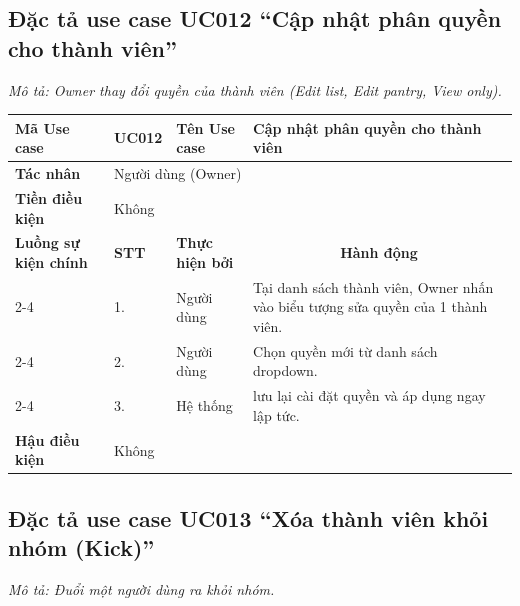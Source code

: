 \documentclass[../main.tex]{subfiles}
\begin{document}
\subsection{Đặc tả use case UC012 ``Cập nhật phân quyền cho thành viên''}
\textit{Mô tả: Owner thay đổi quyền của thành viên (Edit list, Edit pantry, View only).}
\vspace{0.5cm}

\begingroup
\renewcommand{\arraystretch}{1.5}

\begin{longtable}{|p{2.7cm}|p{0.8cm}|p{2.6cm}|p{7.3cm}|}
\hline
\cellcolor[HTML]{D5F5E3}\textbf{Mã Use case} & \multicolumn{1}{l|}{UC012} & \cellcolor[HTML]{D5F5E3}\textbf{Tên Use case} & Cập nhật phân quyền cho thành viên \\ \hline
\cellcolor[HTML]{D5F5E3}\textbf{Tác nhân} & \multicolumn{3}{p{10.7cm}|}{Người dùng (Owner)} \\ \hline
\cellcolor[HTML]{D5F5E3}\textbf{Tiền điều kiện} & \multicolumn{3}{p{10.7cm}|}{Không} \\ \hline

\cellcolor[HTML]{D5F5E3}\textbf{Luồng sự kiện chính} & \cellcolor[HTML]{FDEBD0}\textbf{STT} & \cellcolor[HTML]{FDEBD0}\textbf{Thực hiện bởi} & \multicolumn{1}{c|}{\cellcolor[HTML]{FDEBD0}\textbf{Hành động}} \\ \cline{2-4} 
\cellcolor[HTML]{D5F5E3} & 1. & Người dùng & Tại danh sách thành viên, Owner nhấn vào biểu tượng sửa quyền của 1 thành viên. \\ \cline{2-4} 
\cellcolor[HTML]{D5F5E3} & 2. & Người dùng & Chọn quyền mới từ danh sách dropdown. \\ \cline{2-4} 
\cellcolor[HTML]{D5F5E3} & 3. & Hệ thống & lưu lại cài đặt quyền và áp dụng ngay lập tức. \\ \hline

\cellcolor[HTML]{D5F5E3}\textbf{Hậu điều kiện} & \multicolumn{3}{p{10.7cm}|}{Không} \\ \hline
\end{longtable}
\endgroup

\subsection{Đặc tả use case UC013 ``Xóa thành viên khỏi nhóm (Kick)''}
\textit{Mô tả: Đuổi một người dùng ra khỏi nhóm.}
\vspace{0.5cm}
\end{document}
